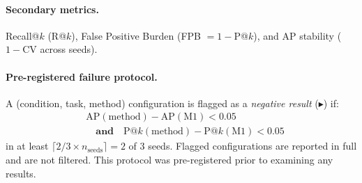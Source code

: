 \paragraph{Secondary metrics.}
Recall@$k$ (R@$k$), False Positive Burden (FPB $= 1 - $P@$k$), and AP stability
($1 - \text{CV}$ across seeds).

\paragraph{Pre-registered failure protocol.}
A (condition, task, method) configuration is flagged as a \emph{negative result}
($\blacktriangleright$) if:
\begin{equation}
\begin{aligned}
  &\text{AP}(\text{method}) - \text{AP}(\text{M1}) < 0.05 \\
  &\quad\textbf{and}\quad
  \text{P@}k(\text{method}) - \text{P@}k(\text{M1}) < 0.05
\end{aligned}
\label{eq:failure}
\end{equation}
in at least $\lceil 2/3 \times n_{\text{seeds}} \rceil = 2$ of 3 seeds.
Flagged configurations are reported in full and are not filtered.
This protocol was pre-registered prior to examining any results.
